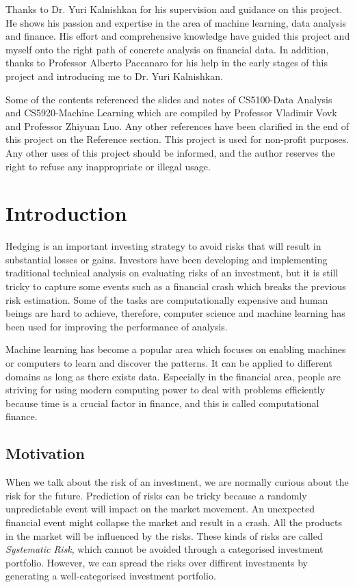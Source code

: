 \documentclass[11pt]{article} %
\theoremstyle{plain}
\theoremstyle{definition}
\begin{document}
Thanks to Dr. Yuri Kalnishkan for his supervision and guidance on this project. He shows his passion and expertise in the area of machine learning, data analysis and finance. His effort and comprehensive knowledge have guided this project and myself onto the right path of concrete analysis on financial data. In addition, thanks to Professor Alberto Paccanaro for his help in the early stages of this project and introducing me to Dr. Yuri Kalnishkan.

Some of the contents referenced the slides and notes of CS5100-Data Analysis and CS5920-Machine Learning which are compiled by Professor Vladimir Vovk and Professor Zhiyuan Luo. Any other references have been clarified in the end of this project on the Reference section. This project is used for non-profit purposes. Any other uses of this project should be informed, and the author reserves the right to refuse any inappropriate or illegal usage.

\clearpage


\section{Introduction}
\setcounter{page}{1}

Hedging is an important investing strategy to avoid risks that will result in substantial losses or gains. Investors have been developing and implementing traditional technical analysis on evaluating risks of an investment, but it is still tricky to capture some events such as a financial crash which breaks the previous risk estimation. Some of the tasks are computationally expensive and human beings are hard to achieve, therefore, computer science and machine learning has been used for improving the performance of analysis.

Machine learning has become a popular area which focuses on enabling machines or computers to learn and discover the patterns. It can be applied to different domains as long as there exists data. Especially in the financial area, people are striving for using modern computing power to deal with problems efficiently because time is a crucial factor in finance, and this is called computational finance.

\subsection{Motivation}

When we talk about the risk of an investment, we are normally curious about the risk for the future. Prediction of risks can be tricky because a randomly unpredictable event will impact on the market movement. An unexpected financial event might collapse the market and result in a crash. All the products in the market will be influenced by the risks. These kinds of risks are called \textsl{Systematic Risk}, which cannot be avoided through a categorised investment portfolio. However, we can spread the risks over diffirent investments by generating a well-categorised investment portfolio.
\end{document}
